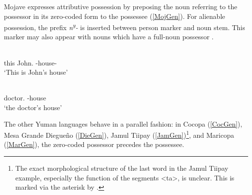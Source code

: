 Mojave expresses attributive possession by preposing the noun referring to the possessor in its zero-coded form  to the possessee (\ref{MojGen}).
For alienable possession, the prefix \emph{n\textsuperscript{y}-} is inserted between person marker and noun stem. 
This marker may also appear with nouns which have a full-noun possessor \citep[16--18]{Munro:1976}.

\begin{exe}\ex\label{MojGen}
\begin{xlist}\ex\gll {} \textbf{} \\
this John.\acc{} \poss{}-house-\nom{}\\
\glt `This is John's house' 

\ex\gll \textbf{} \\
doctor.\acc{} \poss{}-house\\
\glt `the doctor's house' %
\end{xlist}
\end{exe}



%

The other Yuman languages behave in a parallel fashion:\enlargethispage{2\baselineskip}
in Cocopa (\ref{CocGen}), Mesa Grande Diegue\~no (\ref{DieGen}), Jamul Tiipay (\ref{JamGen})\footnote{The exact morphological structure of the last word in the Jamul Tiipay example, especially the function of the segments <ta>, is unclear. This is marked via the asterisk by \citet{Miller:2001}.}, and Maricopa (\ref{MarGen}), the zero-coded possessor precedes the possessee.

